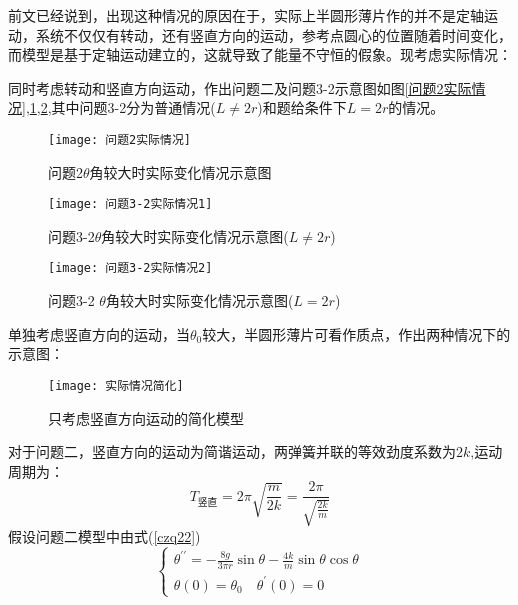\documentclass[withoutpreface,bwprint]{cumcmthesis} %
\begin{document}
	前文已经说到，出现这种情况的原因在于，实际上半圆形薄片作的并不是定轴运动，系统不仅仅有转动，还有竖直方向的运动，参考点圆心的位置随着时间变化，而模型是基于定轴运动建立的，这就导致了能量不守恒的假象。现考虑实际情况：
	
	同时考虑转动和竖直方向运动，作出问题二及问题3-2示意图如图\ref{问题2实际情况},\ref{问题3-2实际情况1},\ref{问题3-2实际情况2},其中问题3-2分为普通情况($L \neq 2r$)和题给条件下$L=2r$的情况。

\begin{figure}[H]
	\centering
	\begin{minipage}[c]{0.48\textwidth}
		\centering
		\texttt{[image: 问题2实际情况]}
		\caption{问题2\quad$\theta$角较大时实际变化情况示意图}
		\label{问题2实际情况}
	\end{minipage}%
	\hfill
	\begin{minipage}[c]{0.48\textwidth}
		\centering
		\texttt{[image: 问题3-2实际情况1]}
		\caption{问题3-2\quad$\theta$角较大时实际变化情况示意图($L \neq 2r$)}
		\label{问题3-2实际情况1}
	\end{minipage}
\end{figure}


	 	\begin{figure}[H]
	\centering
	\texttt{[image: 问题3-2实际情况2]}
	\caption{问题3-2 \quad$\theta$角较大时实际变化情况示意图($L = 2r$)}
	\label{问题3-2实际情况2}
\end{figure}

单独考虑竖直方向的运动，当$\theta_0$较大，半圆形薄片可看作质点，作出两种情况下的示意图：
	 	\begin{figure}[H]
	\centering
	\texttt{[image: 实际情况简化]}
	\caption{只考虑竖直方向运动的简化模型}
	\label{实际情况简化}
\end{figure}

对于问题二，竖直方向的运动为简谐运动，两弹簧并联的等效劲度系数为$2k$,运动周期为：
\begin{equation}\label{ydzq}
	T_{\text{竖直}}=2 \pi \sqrt{\frac{m}{2k}}=\frac{2\pi}{\sqrt{\frac{2k}{m}}}
\end{equation}
假设问题二模型中由式(\ref{czq22})
	\begin{equation}\label{czq22}
\left\{\begin{array}{l}
\theta^{\prime \prime}=-\frac{8g}{3 \pi r} \sin \theta-\frac{4 k}{m} \sin \theta \cos \theta \\
\theta(0)=\theta_{0} \quad \theta^{\prime}(0)=0
\end{array}\right.
\end{equation}
\end{document}
